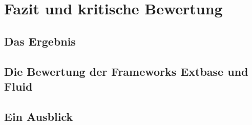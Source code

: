 \chapter{Fazit und kritische Bewertung}
\label{cha:Fazit}


\section{Das Ergebnis}
\label{sec:Ergebnis}

\section{Die Bewertung der Frameworks Extbase und Fluid}
\label{sec:BewertungFrameworks}

\section{Ein Ausblick}
\label{sec:EinAusblick}




